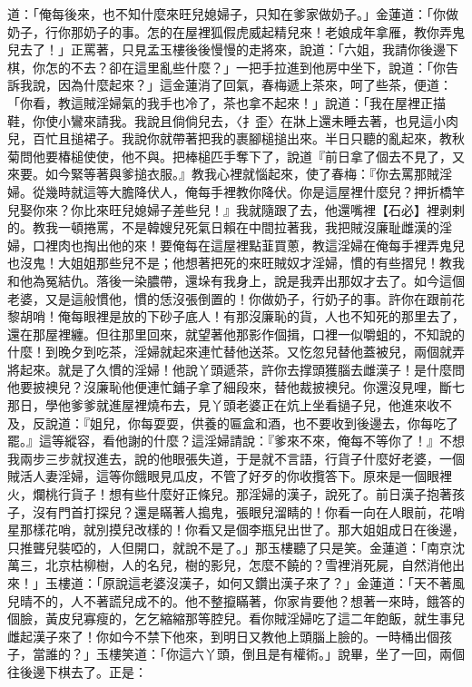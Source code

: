 道：「俺每後來，也不知什麼來旺兒媳婦子，只知在爹家做奶子。」金蓮道：「你做奶子，行你那奶子的事。怎的在屋裡狐假虎威起精兒來！老娘成年拿雁，教你弄鬼兒去了！」正罵著，只見孟玉樓後後慢慢的走將來，說道：「六姐，我請你後邊下棋，你怎的不去？卻在這里亂些什麼？」一把手拉進到他房中坐下，說道：「你告訴我說，因為什麼起來？」這金蓮消了回氣，春梅遞上茶來，呵了些茶，便道：「你看，教這賊淫婦氣的我手也冷了，茶也拿不起來！」說道：「我在屋裡正描鞋，你使小鸞來請我。我說且倘倘兒去，〈扌歪〉在牀上還未睡去著，也見這小肉兒，百忙且搥裙子。我說你就帶著把我的裹腳槌搥出來。半日只聽的亂起來，教秋菊問他要椿槌使使，他不與。把棒槌匹手奪下了，說道『前日拿了個去不見了，又來要。如今緊等著與爹搥衣服。』教我心裡就惱起來，使了春梅：『你去罵那賊淫婦。從幾時就這等大膽降伏人，俺每手裡教你降伏。你是這屋裡什麼兒？押折橋竿兒娶你來？你比來旺兒媳婦子差些兒！』我就隨跟了去，他還嘴裡【石必】裡剥剌的。教我一頓捲罵，不是韓嫂兒死氣日賴在中間拉著我，我把賊沒廉耻雌漢的淫婦，口裡肉也掏出他的來！要俺每在這屋裡點韮買蔥，教這淫婦在俺每手裡弄鬼兒也沒鬼！大姐姐那些兒不是；他想著把死的來旺賊奴才淫婦，慣的有些摺兒！教我和他為冤結仇。落後一染膿帶，還垛有我身上，說是我弄出那奴才去了。如今這個老婆，又是這般慣他，慣的恁沒張倒置的！你做奶子，行奶子的事。許你在跟前花黎胡哨！俺每眼裡是放的下砂子底人！有那沒廉恥的貨，人也不知死的那里去了，還在那屋裡纏。但往那里回來，就望著他那影作個揖，口裡一似嚼蛆的，不知說的什麼！到晚夕到吃茶，淫婦就起來連忙替他送茶。又忔忽兒替他蓋被兒，兩個就弄將起來。就是了久慣的淫婦！他說丫頭遞茶，許你去撑頭獲腦去雌漢子！是什麼問他要披襖兒？沒廉恥他便連忙鋪子拿了細段來，替他裁披襖兒。你還沒見哩，斷七那日，學他爹爹就進屋裡燒布去，見丫頭老婆正在炕上坐看撾子兒，他進來收不及，反說道：『姐兒，你每耍耍，供養的匾盒和酒，也不要收到後邊去，你每吃了罷。』這等縱容，看他謝的什麼？這淫婦請說：『爹來不來，俺每不等你了！』不想我兩步三步就扠進去，說的他眼張失道，于是就不言語，行貨子什麼好老婆，一個賊活人妻淫婦，這等你餓眼見瓜皮，不管了好歹的你收攬答下。原來是一個眼裡火，爛桃行貨子！想有些什麼好正條兒。那淫婦的漢子，說死了。前日漢子抱著孩子，沒有門首打探兒？還是瞞著人搗鬼，張眼兒溜睛的！你看一向在人眼前，花哨星那樣花哨，就別摸兒改樣的！你看又是個李瓶兒出世了。那大姐姐成日在後邊，只推聾兒裝啞的，人但開口，就說不是了。」那玉樓聽了只是笑。金蓮道：「南京沈萬三，北京枯柳樹，人的名兒，樹的影兒，怎麼不饒的？雪裡消死屍，自然消他出來！」玉樓道：「原說這老婆沒漢子，如何又鑽出漢子來了？」金蓮道：「天不著風兒晴不的，人不著謊兒成不的。他不整攛瞞著，你家肯要他？想著一來時，餓答的個臉，黃皮兒寡瘦的，乞乞縮縮那等腔兒。看你賊淫婦吃了這二年飽飯，就生事兒雌起漢子來了！你如今不禁下他來，到明日又教他上頭腦上臉的。一時桶出個孩子，當誰的？」玉樓笑道：「你這六丫頭，倒且是有權術。」說畢，坐了一回，兩個往後邊下棋去了。正是：

